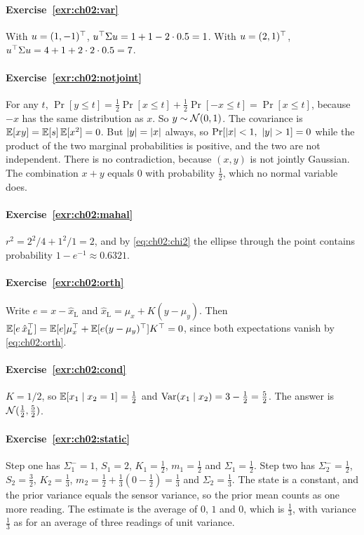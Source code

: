 
\paragraph{Exercise~\ref{exr:ch02:var}}
With $u=(1,-1)^{\top}$, $u^{\top}\Sigma u=1+1-2\cdot0.5=1$. With $u=(2,1)^{\top}$,
$u^{\top}\Sigma u=4+1+2\cdot2\cdot0.5=7$.

\paragraph{Exercise~\ref{exr:ch02:notjoint}}
For any $t$, $\Pr[y\le t]=\tfrac12\Pr[x\le t]+\tfrac12\Pr[-x\le t]=\Pr[x\le t]$,
because $-x$ has the same distribution as $x$. So $y\sim\mathcal{N}(0,1)$. The
covariance is $\mathbb{E}[xy]=\mathbb{E}[s]\,\mathbb{E}[x^2]=0$. But $\lvert y\rvert=\lvert x\rvert$ always, so
$\Pr[\lvert x\rvert<1,\ \lvert y\rvert>1]=0$ while the product of the two marginal probabilities
is positive, and the two are not independent. There is no contradiction,
because $(x,y)$ is not jointly Gaussian. The combination $x+y$ equals $0$ with
probability $\tfrac12$, which no normal variable does.

\paragraph{Exercise~\ref{exr:ch02:mahal}}
$r^2=2^2/4+1^2/1=2$, and by \cref{eq:ch02:chi2} the ellipse through the point
contains probability $1-e^{-1}\approx0.6321$.

\paragraph{Exercise~\ref{exr:ch02:orth}}
Write $e=x-\hat x_{\mathrm L}$ and $\hat x_{\mathrm L}=\mu_x+K(y-\mu_y)$. Then
$\mathbb{E}[e\,\hat x_{\mathrm L}^{\top}]=\mathbb{E}[e]\mu_x^{\top}+\mathbb{E}[e(y-\mu_y)^{\top}]K^{\top}=0$, since both
expectations vanish by \cref{eq:ch02:orth}.

\paragraph{Exercise~\ref{exr:ch02:cond}}
$K=1/2$, so $\mathbb{E}[x_1\mid x_2=1]=\tfrac12$ and $\operatorname{Var}(x_1\mid x_2)=3-\tfrac12=\tfrac52$.
The answer is $\mathcal{N}(\tfrac12,\tfrac52)$.

\paragraph{Exercise~\ref{exr:ch02:static}}
Step one has $\Sigma_1^-=1$, $S_1=2$, $K_1=\tfrac12$, $m_1=\tfrac12$ and
$\Sigma_1=\tfrac12$. Step two has $\Sigma_2^-=\tfrac12$, $S_2=\tfrac32$,
$K_2=\tfrac13$, $m_2=\tfrac12+\tfrac13(0-\tfrac12)=\tfrac13$ and
$\Sigma_2=\tfrac13$. The state is a constant, and the prior variance equals the
sensor variance, so the prior mean counts as one more reading. The estimate is
the average of $0$, $1$ and $0$, which is $\tfrac13$, with variance $\tfrac13$
as for an average of three readings of unit variance.

